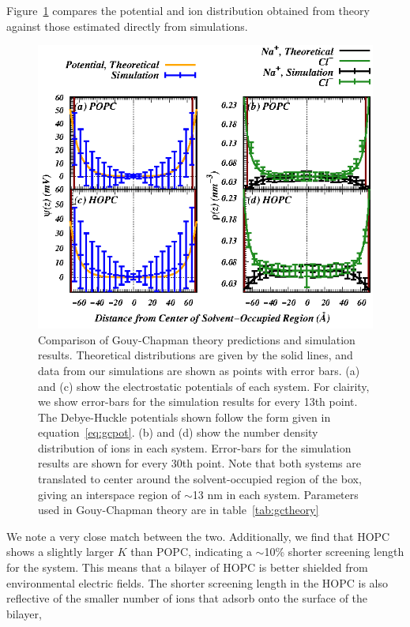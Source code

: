 \documentclass[12pt,preprint,times,openany,draft]{book}
\newcommand{\about}{$\sim$}
\begin{document}
Figure~\ref{fig:gctheory} compares the potential and ion distribution 
obtained from theory against those estimated directly from simulations. 

\begin{figure}
\caption{ 
Comparison of Gouy-Chapman theory predictions and simulation results. Theoretical distributions are given by the 
solid lines, and data from our simulations are shown as points with error bars. (a) and (c) show the electrostatic
potentials of each system. For clairity, we show error-bars for the simulation
results for every 13th point. The Debye-Huckle 
potentials shown follow the form given in equation~\ref{eq:gcpot}. (b) and (d) show the number density distribution
of ions in each system. Error-bars for the 
simulation results are shown
for every 30th point. Note that both systems are
translated to center around the solvent-occupied region of the box, giving an interspace region of \about 13 nm in
each system. Parameters used in Gouy-Chapman theory are in table~\ref{tab:gctheory} }
\label{fig:gctheory}
\includegraphics[width=\textwidth]{gouy.eps}
\end{figure}
We note a very close match between the two. Additionally, we find that HOPC shows a slightly 
larger $K$ than POPC, indicating a \about10\% shorter screening length for the system. This means that a bilayer of HOPC is better shielded from environmental electric fields.
The shorter screening length in the HOPC is also reflective of the smaller number of ions that adsorb onto the surface of the bilayer, 
\end{document}
